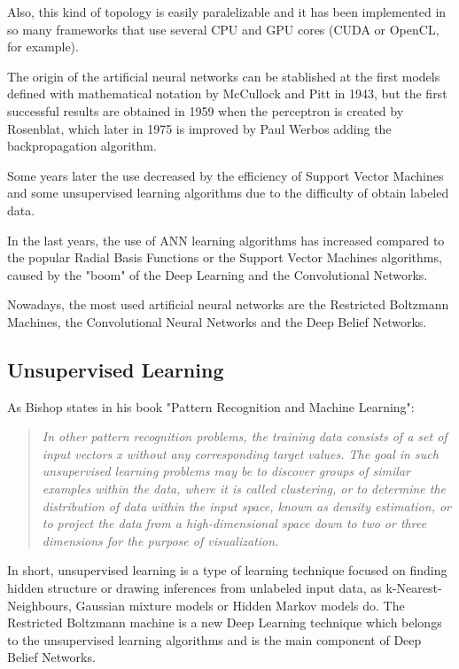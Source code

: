 \documentclass[a4paper,openany,oneside,12pt]{book}
\begin{document}
Also, this kind of topology is easily paralelizable and it has been implemented in so many frameworks that use several CPU and GPU cores (CUDA or OpenCL, for example).

The origin of the artificial neural networks can be stablished at the first models defined with mathematical notation by McCullock and Pitt in 1943, but the first successful results are obtained in 1959 when the perceptron is created by Rosenblat, which later in 1975 is improved by Paul Werbos adding the backpropagation algorithm.

Some years later the use decreased by the efficiency of Support Vector Machines and some unsupervised learning algorithms due to the difficulty of obtain labeled data.

In the last years, the use of ANN learning algorithms has increased compared to the popular Radial Basis Functions or the Support Vector Machines algorithms, caused by the "boom" of the Deep Learning and the Convolutional Networks.

Nowadays, the most used artificial neural networks are the Restricted Boltzmann Machines, the Convolutional Neural Networks and the Deep Belief Networks.

\subsection{Unsupervised Learning}
As Bishop states in his book "Pattern Recognition and Machine Learning":
\begin{quote}
\em In other pattern recognition problems, the training data consists of a set of input vectors x without any corresponding target values. The goal in such unsupervised learning problems may be to discover groups of similar examples within the data, where it is called clustering, or to determine the distribution of data within the input space, known as density estimation, or to project the data from a high-dimensional space down to two or three dimensions for the purpose of visualization.\cite{Bishop}
\end{quote}

In short, unsupervised learning is a type of learning technique focused on finding hidden structure or drawing inferences from unlabeled input data, as k-Nearest-Neighbours, Gaussian mixture models or Hidden Markov models do. The Restricted Boltzmann machine is a new Deep Learning technique which belongs to the unsupervised learning algorithms and is the main component of Deep Belief Networks.
\end{document}
